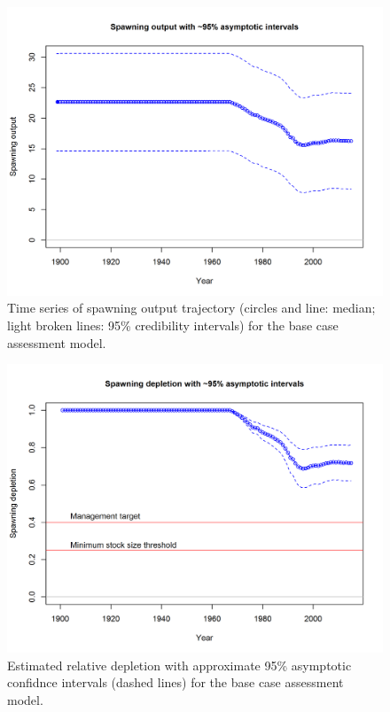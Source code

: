 \documentclass[12pt,]{article}
\begin{document}
\FloatBarrier

\begin{figure}[htbp]
\centering
\includegraphics{r4ss/plots_mod1/ts7_Spawning_output_with_95_asymptotic_intervals_intervals.png}
\caption{Time series of spawning output trajectory (circles and line:
median; light broken lines: 95\% credibility intervals) for the base
case assessment model. \label{fig:Spawnbio_all}}
\end{figure}

\begin{figure}[htbp]
\centering
\includegraphics{r4ss/plots_mod1/ts9_Spawning_depletion_with_95_asymptotic_intervals_intervals.png}
\caption{Estimated relative depletion with approximate 95\% asymptotic
confidnce intervals (dashed lines) for the base case assessment model.
\label{fig:RelDeplete_all}}
\end{figure}
\end{document}
